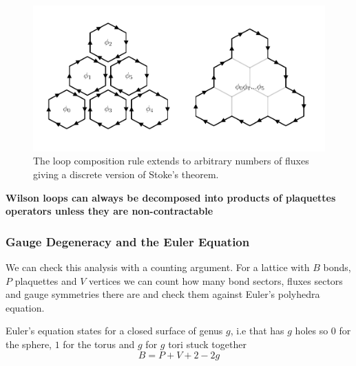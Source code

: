 \begin{figure}
\hypertarget{fig:stokes_theorem}{%
\centering
\includegraphics{figure_code/amk_chapter/stokes_theorem/stokes_theorem.pdf}
\caption{The loop composition rule extends to arbitrary numbers of
fluxes giving a discrete version of Stoke's
theorem.}\label{fig:stokes_theorem}
}
\end{figure}

\textbf{Wilson loops can always be decomposed into products of
plaquettes operators unless they are non-contractable}

\hypertarget{gauge-degeneracy-and-the-euler-equation}{%
\subsubsection{Gauge Degeneracy and the Euler
Equation}\label{gauge-degeneracy-and-the-euler-equation}}

We can check this analysis with a counting argument. For a lattice with
\(B\) bonds, \(P\) plaquettes and \(V\) vertices we can count how many
bond sectors, fluxes sectors and gauge symmetries there are and check
them against Euler's polyhedra equation.

Euler's equation states for a closed surface of genus \(g\), i.e that
has \(g\) holes so \(0\) for the sphere, \(1\) for the torus and \(g\)
for \(g\) tori stuck together \[B = P + V + 2 - 2g\]

